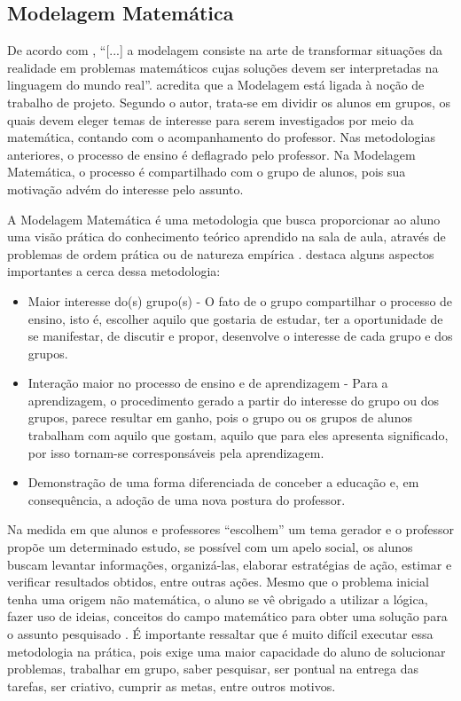 \subsection{Modelagem Matemática}

De acordo com , ``[...] a modelagem consiste na arte de transformar situações da realidade em 
problemas matemáticos cujas soluções devem ser interpretadas na linguagem do mundo real''.  acredita 
que a Modelagem está ligada \`a noção de trabalho de projeto. Segundo o autor, trata-se em dividir os alunos em grupos, os quais devem 
eleger temas de interesse para serem investigados por meio da matemática, contando com o acompanhamento do professor. Nas metodologias 
anteriores, o processo de ensino é deflagrado pelo professor. Na Modelagem Matemática, o processo é compartilhado com o grupo de 
alunos, pois sua motivação advém do interesse pelo assunto.

A Modelagem Matemática é uma metodologia que busca proporcionar ao aluno uma visão prática do conhecimento teórico aprendido na 
sala de aula, através de problemas de ordem prática ou de natureza empírica \cite{fossa1998tendencias}.  
destaca alguns aspectos importantes a cerca dessa metodologia:

\begin{itemize}
	\item Maior interesse do(s) grupo(s) - O fato de o grupo compartilhar o processo de ensino, isto é, escolher aquilo que gostaria 
 de estudar, ter a oportunidade de se manifestar, de discutir e propor, desenvolve o interesse de cada grupo e dos grupos.
	\item Interação maior no processo de ensino e de aprendizagem - Para a aprendizagem, o procedimento gerado a partir do interesse do 
grupo ou dos grupos, parece resultar em ganho, pois o grupo ou os grupos de alunos trabalham com aquilo que gostam, aquilo que para 
eles apresenta significado, por isso tornam-se corresponsáveis pela aprendizagem.
	\item Demonstração de uma forma diferenciada de conceber a educação e, em consequência, a adoção de uma nova postura do professor. 
\end{itemize}

Na medida em que alunos e professores ``escolhem'' um tema gerador e o professor prop\~oe um determinado estudo, se poss\'ivel com um apelo social, os alunos buscam levantar informa\c{c}\~oes, organiz\'a-las, elaborar estratégias de a\c{c}\~ao, estimar e verificar resultados obtidos, entre outras a\c{c}\~oes. Mesmo que o problema inicial tenha uma origem n\~ao matem\'atica, o aluno se v\^e obrigado a utilizar a l\'ogica, fazer uso de ideias, conceitos do campo matem\'atico para obter uma solu\c{c}\~ao para o assunto pesquisado 
\cite{silva2007modelagem}. \'E importante ressaltar que \'e muito difícil executar essa metodologia na pr\'atica, pois exige uma maior capacidade do aluno de solucionar problemas, trabalhar em grupo, saber pesquisar, ser pontual na entrega das tarefas, ser criativo, 
cumprir as metas, entre outros motivos.

